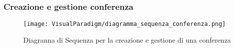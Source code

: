 
\subsubsection{Creazione e gestione conferenza}
\label{sec:sequenza_conferenza}
\begin{figure}[ht]
  \centering
  \texttt{[image: VisualParadigm/diagramma\_sequenza\_conferenza.png]}
  \caption{Diagranna di Sequenza per la creazione e gestione di una conferenza}
  \label{fig:conferenza}
\end{figure}

